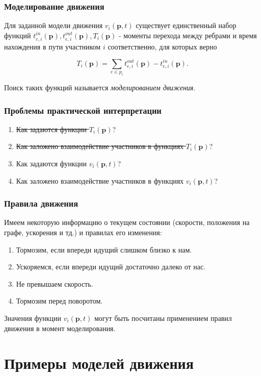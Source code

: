 \documentclass{beamer}
\begin{document}
\begin{frame}\frametitle{Моделирование движения}
\begin{theorem}
	Для заданной модели движения $v_i(\textbf{p}, t)$ существует единственный набор функций $t_{e, i}^{in}(\textbf{p}), t_{e, i}^{out}(\textbf{p}), T_i(\textbf{p})$ - моменты перехода между ребрами и время нахождения в пути участником $i$ соответственно, для которых верно
	
	$$T_i(\textbf{p}) = \sum \limits_{e \in p_i} t_{e, i}^{out}(\textbf{p}) - t_{e, i}^{in}(\textbf{p}).$$
\end{theorem}

Поиск таких функций называется \textit{моделированием движения}.
\end{frame}

\begin{frame}\frametitle{Проблемы практической интерпретации}
\begin{enumerate}
	\item \sout{Как задаются функции $T_i(\textbf{p})$}?
	\item \sout{Как заложено взаимодействие участников в функциях $T_i(\textbf{p})$}?
	\item Как задаются функции $v_i(\textbf{p}, t)$?
	\item Как заложено взаимодействие участников в функциях $v_i(\textbf{p}, t)$?
\end{enumerate}
\end{frame}

\begin{frame}\frametitle{Правила движения}

Имеем некоторую информацию о текущем состоянии (скорости, положения на графе, ускорения и тд.) и правилах его изменения:
\begin{enumerate}
	\item Тормозим, если впереди идущий слишком близко к нам.
	\item Ускоряемся, если впереди идущий достаточно далеко от нас.
	\item Не превышаем скорость.
	\item Тормозим перед поворотом.
\end{enumerate}
Значения функции $v_i(\textbf{p}, t)$ могут быть посчитаны применением правил движения в момент моделирования.

\end{frame}

\section{Примеры моделей движения}
\end{document}
